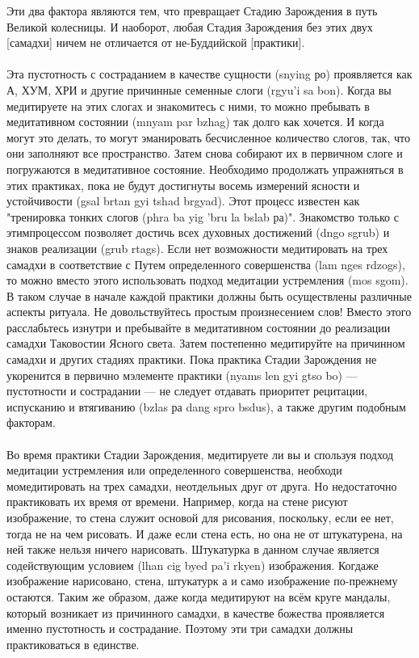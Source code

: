 \begin{siderules}
Эти два фактора являются тем, что превращает Стадию Зарождения в путь Великой
колесницы. И наоборот, любая Стадия Зарождения без этих двух [самадхи] ничем не
отличается от не-Буддийской [практики].\\
\\
Эта пустотность с состраданием в качестве сущности (snying ро) проявляется как А, ХУМ,
ХРИ и другие причинные семенные слоги (rgyu'i sa bon). Когда вы медитируете на этих
слогах и знакомитесь с ними, то можно пребывать в медитативном состоянии (mnyam par
bzhag) так долго как хочется. И когда могут это делать, то могут эманировать бесчисленное
количество слогов, так, что они заполняют все пространство. Затем снова собирают их в
первичном слоге и погружаются в медитативное состояние. Необходимо продолжать
упражняться в этих практиках, пока не будут достигнуты восемь измерений ясности и
устойчивости (gsal brtan gyi tshad brgyad). Этот процесс известен как "тренировка тонких
слогов (phra ba yig 'bru la bslab ра)". Знакомство только с этимпроцессом позволяет достичь
всех духовных достижений (dngo sgrub) и знаков реализации (grub rtags).
Если нет возможности медитировать на трех самадхи в соответствие с Путем определенного
совершенства (lam nges rdzogs), то можно вместо этого использовать подход
медитации устремления (mos sgom). В таком случае в начале каждой практики должны быть
осуществлены различные аспекты ритуала. Не довольствуйтесь простым произнесением
слов! Вместо этого расслабьтесь изнутри и пребывайте в медитативном состоянии до
реализации самадхи Таковостии Ясного света. Затем постепенно медитируйте на причинном
самадхи и других стадиях практики. Пока практика Стадии Зарождения не укоренится в
первично мэлементе практики (nyams len gyi gtso bo) — пустотности и сострадании — не
следует отдавать приоритет рецитации, испусканию и втягиванию (bzlas ра dang spro bsdus),
а также другим подобным факторам.\\
\\
Во время практики Стадии Зарождения, медитируете ли вы и спользуя подход медитации
устремления или определенного совершенства, необходи момедитировать на трех самадхи,
неотдельных друг от друга. Но не\-достаточно практиковать их время от времени. Например,
когда на стене рисуют изображение, то стена служит основой для рисования, поскольку, если
ее нет, тогда не на чем рисовать. И даже если стена есть, но она не от штукатурена, на ней
также нельзя ничего нарисовать. Штукатурка в данном случае является содействующим
условием (lhan cig byed pa'i rkyen) изображения. Когдаже изображение нарисовано, стена,
штукатурк а и само изображе\-ние по-прежнему остаются. Таким же образом, даже когда
медитируют на всём круге мандалы, который возникает из причинного самадхи, в качестве
божества проявляется именно пустотность и сострадание. Поэтому эти три самадхи должны
практиковаться в единстве.

\end{siderules}
